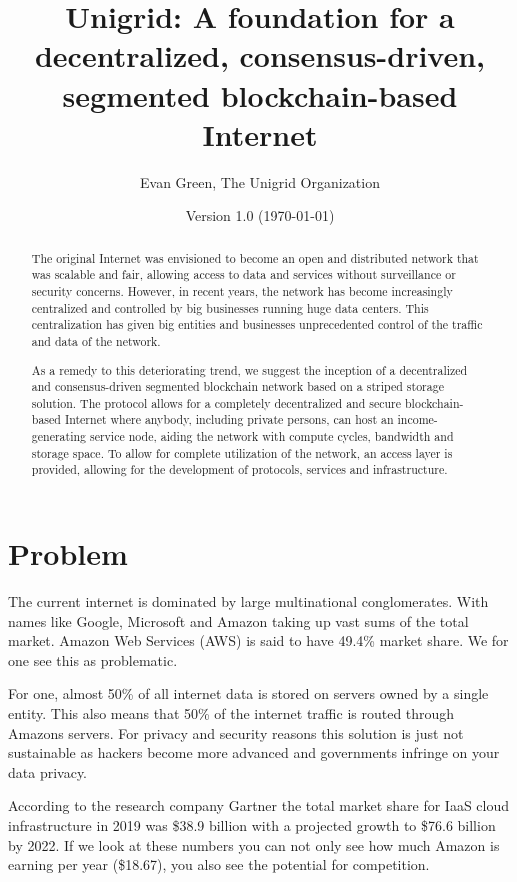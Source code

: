 \documentclass[12pt]{article}
\author{Evan Green, The Unigrid Organization}
\title{Unigrid: A foundation for a decentralized, consensus-driven, segmented blockchain-based Internet}
\date{Version 1.0 (\today)}
\begin{document}
\maketitle


\newpage
\thispagestyle{fancy}

\begin{abstract}
The original Internet was envisioned to become an open and distributed network that was scalable and fair, allowing access to data and services without surveillance or security concerns. However, in recent years, the network has become increasingly centralized and controlled by big businesses running huge data centers. This centralization has given big entities and businesses unprecedented control of the traffic and data of the network.

As a remedy to this deteriorating trend, we suggest the inception of a decentralized and consensus-driven segmented blockchain network based on a striped storage solution. The protocol allows for a completely decentralized and secure blockchain-based Internet where anybody, including private persons, can host an income-generating service node, aiding the network with compute cycles, bandwidth and storage space. To allow for complete utilization of the network, an access layer is provided, allowing for the development of protocols, services and infrastructure.

\end{abstract}

\newpage
\section*{Problem}
The current internet is dominated by large multinational conglomerates. With names like Google, Microsoft and Amazon taking up vast sums of the total market. Amazon Web Services (AWS) is said to have 49.4\% market share. We for one see this as problematic.

For one, almost 50\% of all internet data is stored on servers owned by a single entity. This also means that 50\% of the internet traffic is routed through Amazons servers. For privacy and security reasons this solution is just not sustainable as hackers become more advanced and governments infringe on your data privacy.

According to the research company Gartner the total market share for IaaS cloud infrastructure in 2019 was \$38.9 billion with a projected growth to \$76.6 billion by 2022. If we look at these numbers you can not only see how much Amazon is earning per year (\$18.67), you also see the potential for competition.
\end{document}
